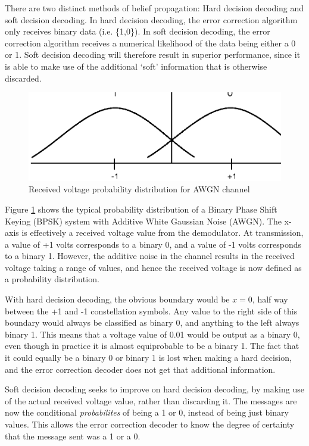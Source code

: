 \documentclass[11pt]{article}
\numberwithin{equation}{subsection}
\begin{document}
There are two distinct methods of belief propagation: Hard decision decoding and soft decision decoding. In hard decision decoding, the error correction algorithm only receives binary data (i.e. \{1,0\}). In soft decision decoding, the error correction algorithm receives a numerical likelihood of the data being either a 0 or 1. Soft decision decoding will therefore result in superior performance, since it is able to make use of the additional `soft' information that is otherwise discarded.

\begin{figure}[h]
\centering
\includegraphics{BPSK_channel_graph}
\caption{Received voltage probability distribution for AWGN channel}
\label{figure:awgn probability graph}
\end{figure}

Figure \ref{figure:awgn probability graph} shows the typical probability distribution of a Binary Phase Shift Keying (BPSK) system with Additive White Gaussian Noise (AWGN). The x-axis is effectively a received voltage value from the demodulator. At transmission, a value of +1 volts corresponds to a binary 0, and a value of -1 volts corresponds to a binary 1. However, the additive noise in the channel results in the received voltage taking a range of values, and hence the received voltage is now defined as a probability distribution.

With hard decision decoding, the obvious boundary would be $x = 0$, half way between the +1 and -1 constellation symbols. Any value to the right side of this boundary would always be classified as binary 0, and anything to the left always binary 1. This means that a voltage value of 0.01 would be output as a binary 0, even though in practice it is almost equiprobable to be a binary 1. The fact that it could equally be a binary 0 or binary 1 is lost when making a hard decision, and the error correction decoder does not get that additional information.

Soft decision decoding seeks to improve on hard decision decoding, by making use of the actual received voltage value, rather than discarding it. The messages are now the conditional \textit{probabilites} of being a 1 or 0, instead of being just binary values. This allows the error correction decoder to know the degree of certainty that the message sent was a 1 or a 0.
\end{document}

